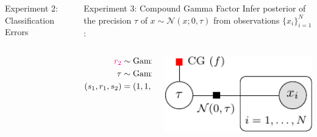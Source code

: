 \documentclass[english]{beamer}
\begin{document}
\begin{frame}
\begin{columns}[t]
\begin{block}{ Experiment 2: Classification Errors}
\end{block}

\begin{block}{ Experiment 3: Compound Gamma Factor }
Infer posterior of the precision $\tau$ of $x \sim \mathcal{N}(x; 0, \tau)$ 
from observations $\{x_i\}_{i=1}^N $:
%
\noindent
\begin{columns}[T]
   \hspace{-5cm}
   \begin{column}{1cm}
       \begin{align*}
          \textcolor{magenta}{r_2} &\sim \mathrm{Gamma}(r_2; s_1, r_1)  \\
          \tau &\sim \mathrm{Gamma}(\tau; s_2, \textcolor{magenta}{r_2} ) \\
          (s_1, r_1, s_2) &= (1, 1, 1).
       \end{align*}
   \end{column}
   \hspace{-10cm}
   \begin{column}{1cm}
   \includegraphics[width=11cm]{img/compound_gamma_graph-crop}
   \end{column}
\end{columns}
%
\begin{figure}[ht]
  \centering
\end{figure}
\end{block}
\end{columns}
\end{frame}
\end{document}
